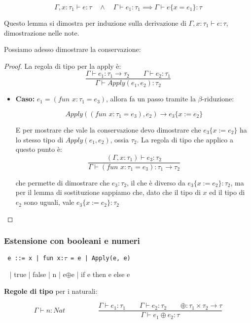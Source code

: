 \documentclass[a4paper,10pt]{article}
\begin{document}
   \[ \Gamma,x : \tau_1 \vdash e:\tau \quad \wedge \quad\Gamma \vdash e_1 : \tau_1 \implies \Gamma \vdash e\{ x=e_1 \} :\tau \]
   
   Questo lemma si dimostra per induzione sulla derivazione di $\Gamma, x :\tau_1 \vdash e : \tau$, dimostrazione nelle note.\medskip
   
   Possiamo adesso dimostrare la conservazione:
   
   \begin{proof} 
   La regola di tipo per la apply è:
   \[ \dfrac{\Gamma \vdash e_1 : \tau_1 \to \tau_2 \quad\quad \Gamma \vdash e_2 : \tau_1}{\Gamma \vdash Apply(e_1, e_2) : \tau_2} \]
   
   \begin{itemize}
    \item \textbf{Caso:} $e_1 = (fun \,\, x:\tau_1 = e_3)$, allora fa un passo tramite la $\beta$-riduzione:
    
    \[ Apply((fun\,\, x : \tau_1 = e_3), e_2) \to e_3\{x := e_2\} \]
    
    E per mostrare che vale la conservazione devo dimostrare che $e_3\{ x := e_2 \}$ ha lo stesso tipo di $Apply(e_1, e_2)$, ossia $\tau_2$. La regola di tipo che applico a questo punto è:
    \[ \dfrac{(\Gamma , x : \tau_1) \vdash e_3 : \tau_2}{\Gamma \vdash (fun\,\, x: \tau_1 = e_3) :\tau_1 \to \tau_2} \]
   
   che permette di dimostrare che $e_3 : \tau_2$, il che è diverso da $e_3\{ x := e_2 \} : \tau_2$, ma per il lemma di sostituzione sappiamo che, dato che il tipo di $x$ ed il tipo di $e_2$ sono uguali, vale $e_3\{x := e_2\} : \tau_2$ 
   
   \end{itemize}
   \end{proof}
\newpage
    \subsubsection{Estensione con booleani e numeri}
    \begin{flushleft}
     \tt  
     e ::= x | fun x:$\tau$ = e | Apply(e, e) 
     
     \quad \quad\quad\quad\,\,\,\,\,| true | false | n | e$\oplus$e | if e then e else e
     \end{flushleft}


    \textbf{Regole di tipo} per i naturali:
    
    \[ \Gamma \vdash n : Nat\hspace{2cm} \dfrac{\Gamma \vdash e_1 : \tau_1 \quad\quad \Gamma \vdash e_2 : \tau_2 \quad\quad \oplus : \tau_1 \times \tau_2 \to \tau}{\Gamma \vdash e_1 \oplus e_2 : \tau} \]
   
\end{document}
